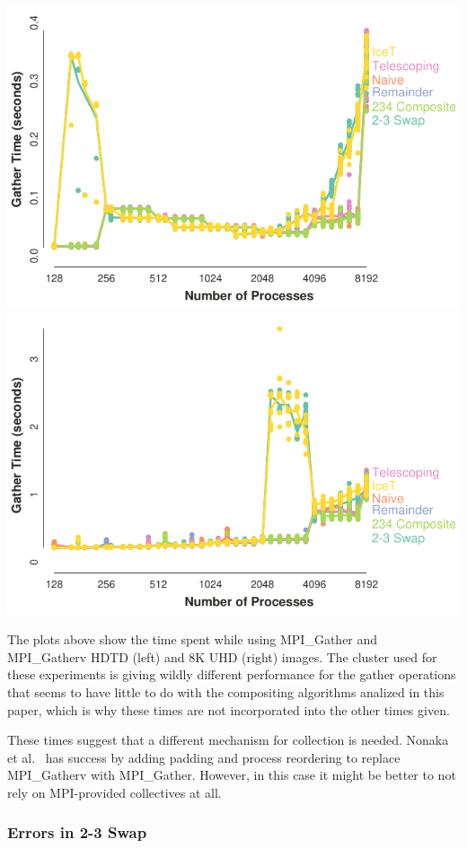 \documentclass{vgtc}                          %
\newcommand*{\scite}[1]{~\cite{#1}}
\newcommand{\etal}{et al.\xspace}
\begin{document}
\noindent
\includegraphics[width=.5\linewidth]{gather-hdtv}%
\includegraphics[width=.5\linewidth]{gather-8k}

The plots above show the time spent while using MPI\_Gather and MPI\_Gatherv HDTD (left) and 8K UHD (right) images.
The cluster used for these experiments is giving wildly different performance for the gather operations that seems to have little to do with the compositing algorithms analized in this paper, which is why these times are not incorporated into the other times given.

These times suggest that a different mechanism for collection is needed.
Nonaka \etal\scite{Nonaka2018} has success by adding padding and process reordering to replace MPI\_Gatherv with MPI\_Gather.
However, in this case it might be better to not rely on MPI-provided collectives at all.

\subsubsection{Errors in 2-3 Swap}
\label{sec:2-3SwapErrors}
\end{document}
